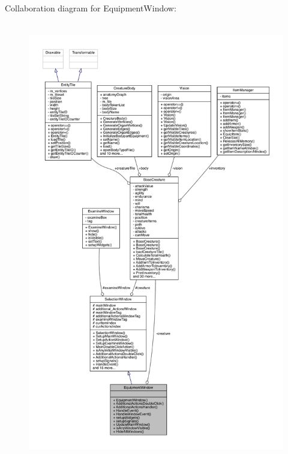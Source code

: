 Collaboration diagram for Equipment\+Window\+:
\nopagebreak
\begin{figure}[H]
\begin{center}
\leavevmode
\includegraphics[height=550pt]{d2/d39/class_equipment_window__coll__graph}
\end{center}
\end{figure}

